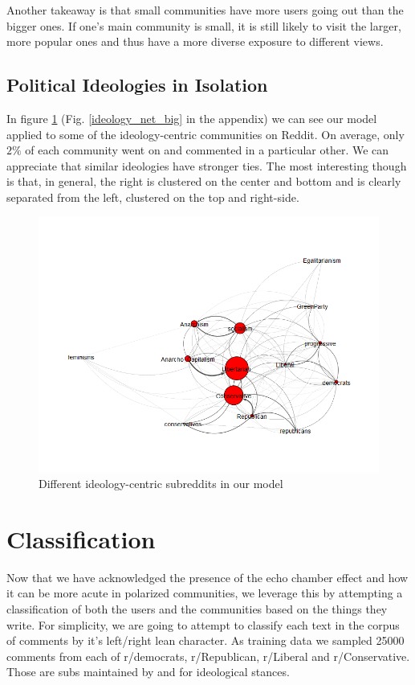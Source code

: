 \documentclass[11pt]{article}
\begin{document}
Another takeaway is that small communities have more users going out than the bigger ones. If one's main community is small, it is still likely to visit the larger, more popular ones and thus have a more diverse exposure to different views.

\subsection{Political Ideologies in Isolation}

In figure \ref{ideology_net} (Fig. \ref{ideology_net_big} in the appendix) we can see our model applied to some of the ideology-centric communities on Reddit. On average, only $2\%$ of each community went on and commented in a particular other. We can appreciate that similar ideologies have stronger ties. The most interesting though is that, in general, the right is clustered on the center and bottom and is clearly separated from the left, clustered on the top and right-side.

\begin{figure}[h]
	\includegraphics[width=\columnwidth]{img/ideology_network.png}
	\caption{\label{ideology_net} Different ideology-centric subreddits in our model}
\end{figure}

\section{Classification}

Now that we have acknowledged the presence of the echo chamber effect and how it can be more acute in polarized communities, we leverage this by attempting a classification of both the users and the communities based on the things they write. For simplicity, we are going to attempt to classify each text in the corpus of comments by it's left/right lean character.
As training data we sampled 25000 comments from each of r/democrats, r/Republican, r/Liberal and r/Conservative. Those are subs maintained by and for ideological stances.
\end{document}
